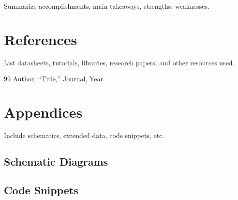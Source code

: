 \documentclass[12pt]{article}
\begin{document}
Summarize accomplishments, main takeaways, strengths, weaknesses.

\section{References}

List datasheets, tutorials, libraries, research papers, and other resources used.

\begin{thebibliography}{99}
 Author, ``Title,'' Journal, Year.
\end{thebibliography}

\newpage
\appendix
\section{Appendices}

Include schematics, extended data, code snippets, etc.

\subsection{Schematic Diagrams}

\subsection{Code Snippets}
\end{document}
